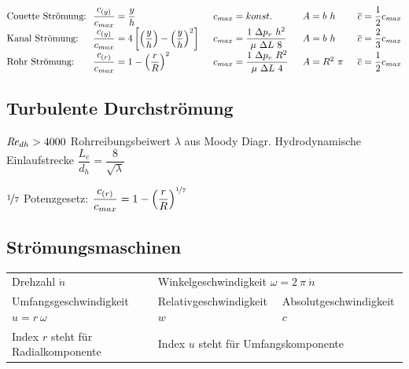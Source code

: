 	\skipabove{-5pt}
	\[ \arraycolsep=0em
	\begin{array}{l p{0.7em} l p{1.5em} l p{1.5em} l p{1.5em} l} %
		\text{Couette Strömung:} && \dfrac{c_{(y)}}{c_{max}} = \dfrac{y}{h}                                                            && c_{max} = konst.                                       && A = b\ h     && \overline{c} = \dfrac{1}{2} c_{max} \\
		\text{Kanal Strömung:}   && \dfrac{c_{(y)}}{c_{max}} = 4 \left[\left(\dfrac{y}{h}\right) - \left(\dfrac{y}{h}\right)^2 \right] && c_{max} = \dfrac{1\ \Delta p_v\ h^2}{\mu\ \Delta L\ 8} && A = b\ h     && \overline{c} = \dfrac{2}{3} c_{max} \\
		\text{Rohr Strömung:}    && \dfrac{c_{(r)}}{c_{max}} = 1 - \left(\dfrac{r}{R}\right)^2                                         && c_{max} = \dfrac{1\ \Delta p_v\ R^2}{\mu\ \Delta L\ 4} && A = R^2\ \pi && \overline{c} = \dfrac{1}{2} c_{max}
	\end{array}
	\]
\subsection{Turbulente Durchströmung}
	$ \operatorname{\mathit{R\kern-.10em e}}_{dh} > 4000 $ \quad	Rohrreibungsbeiwert $ \lambda $ aus Moody Diagr. \qquad	Hydrodynamische Einlaufstrecke $ \dfrac{L_e}{d_h} = \dfrac{8}{\sqrt{\lambda}}  $

	$ \nicefrac{1}{7} $ Potenzgesetz: $ \dfrac{c_{(r)}}{c_{max}} = 1 - \left(\dfrac{r}{R}\right)^{\nicefrac{1}{7}} $

\subsection{Strömungsmaschinen}
%
	\begin{flushleft}
		\setlength{\tabcolsep}{1.3em} %
		\begin{tabular}{lll}
			Drehzahl $ \dot{n} $                     & \multicolumn{2}{l}{Winkelgeschwindigkeit $ \omega = 2\ \pi\ \dot{n} $}                              \\
			Umfangsgeschwindigkeit $ u = r\ \omega $ & Relativgeschwindigkeit $ w $                       & Absolutgeschwindigkeit $ c $ \\
			Index $ r $ steht für Radialkomponente   & \multicolumn{2}{l}{Index $ u $ steht für Umfangskomponente}
		\end{tabular}
	\end{flushleft}

